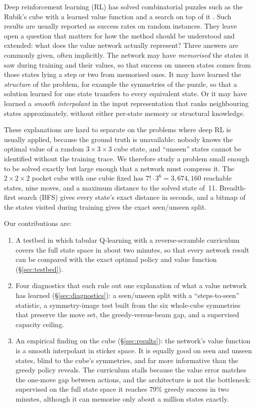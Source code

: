 \documentclass[11pt]{article}
\begin{document}
Deep reinforcement learning (RL) has solved combinatorial puzzles such as the Rubik's cube
with a learned value function and a search on top of it \citep{mcaleer2018,agostinelli2019}.
Such results are usually reported as success rates on random instances. They leave open a
question that matters for how the method should be understood and extended: what does the value
network actually represent? Three answers are commonly given, often implicitly.
The network may have \emph{memorised} the states it saw during training and their values, so
that success on unseen states comes from those states lying a step or two from memorised
ones. It may have learned the \emph{structure} of the problem, for example the symmetries of the
puzzle, so that a solution learned for one state transfers to every equivalent state.
Or it may have learned a \emph{smooth interpolant} in the input representation that ranks
neighbouring states approximately, without either per-state memory or structural knowledge.

These explanations are hard to separate on the problems where deep RL is usually applied,
because the ground truth is unavailable: nobody knows the optimal value of a random
$3\times3\times3$ cube state, and ``unseen'' states cannot be identified without the training
trace. We therefore study a problem small enough to be solved exactly but large enough that a
network must compress it. The $2\times2\times2$ pocket cube with one cubie fixed has
$7!\cdot3^6 = 3{,}674{,}160$ reachable states, nine moves, and a maximum distance to the solved
state of~11. Breadth-first search (BFS) gives every state's exact distance in seconds, and a
bitmap of the states visited during training gives the exact seen/unseen split.

Our contributions are:
\begin{enumerate}
\item A testbed in which tabular Q-learning with a reverse-scramble curriculum covers the full
  state space in about two minutes, so that every network result can be compared with the exact
  optimal policy and value function (\S\ref{sec:testbed}).
\item Four diagnostics that each rule out one explanation of what a value network has learned
  (\S\ref{sec:diagnostics}): a seen/unseen split with a ``steps-to-seen'' statistic, a
  symmetry-image test built from the six whole-cube symmetries that preserve the move set, the
  greedy-versus-beam gap, and a supervised capacity ceiling.
\item An empirical finding on the cube (\S\ref{sec:results}): the network's value function is
  a smooth interpolant in sticker space. It is equally good on seen and unseen states, blind to
  the cube's symmetries, and far more informative than the greedy policy reveals. The
  curriculum stalls because the value error matches the one-move gap between actions, and the
  architecture is not the bottleneck: supervised on the full state space it reaches $79\%$
  greedy success in two minutes, although it can memorise only about a million states exactly.
\end{enumerate}
\end{document}
